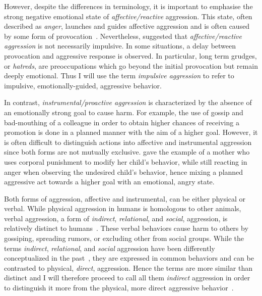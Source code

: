 However, despite the differences in terminology, it is important to emphasise the strong negative emotional state of \textit{affective/reactive} aggression.
This state, often described as \textit{anger}, launches and guides affective aggression  and is often caused by some form of provocation~\cite{Geen2001}.
Nevertheless, \citet{Frijda1994} suggested that \textit{affective/reactive aggression} is not necessarily impulsive.
In some situations, a delay between provocation and aggressive response is observed. 
In particular, long term grudges, or \textit{hatreds}, are preoccupations which go beyond the initial provocation but remain deeply emotional.
Thus I will use the term \textit{impulsive aggression} to refer to impulsive, emotionally-guided, aggressive behavior.

In contrast, \textit{instrumental/proactive aggression} is characterized by the absence of an emotionally strong goal to cause harm.
For example, the use of gossip and bad-mouthing of a colleague in order to obtain higher chances of receiving a promotion is done in a planned manner with the aim of a higher goal.
However, it is often difficult to distinguish actions into affective and instrumental aggression since both forms are not mutually exclusive.
\citet{Geen2001} gave the example of a mother who uses corporal punishment to modify her child's behavior, while still reacting in anger when observing the undesired child's behavior,
hence mixing a planned aggressive act towards a higher goal with an emotional, angry state.

Both forms of aggression, affective and instrumental, can be either physical or verbal.
While physical aggression in humans is homologous to other animals, verbal aggression, a form of \textit{indirect}, \textit{relational}, and \textit{social}, aggression, is relatively distinct to humans~\cite{Archer2005}.
These verbal behaviors cause harm to others by gossiping, spreading rumors, or excluding other from social groups.
While the terms \textit{indirect}, \textit{relational}, and \textit{social} aggression have been differently conceptualized in the past~\cite{Archer2001}, they are expressed in common behaviors and can be contrasted to physical, \textit{direct}, aggression.
Hence the terms are more similar than distinct and I will therefore proceed to call all them \textit{indirect} aggression in order to distinguish it more from the physical, more direct aggressive behavior~\cite{Archer2005}.

